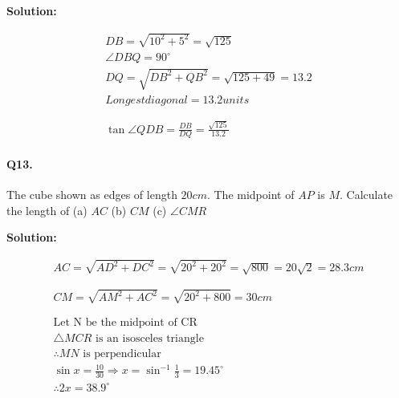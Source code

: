 \documentclass{article}
\begin{document}
{\scriptsize \textbf{Solution:}}

\[
  \begin{aligned}
    DB = \sqrt{10^{2}+5^{2}} = \sqrt{125} \\
    \angle DBQ = 90^{\circ} \\
    DQ = \sqrt{DB^{2}+QB^{2}} = \sqrt{125+49} = 13.2 \\
    Longest diagonal = 13.2 units \\
    \\
    \\
    \tan \angle QDB = \frac{DB}{DQ} = \frac{\sqrt{125}}{13.2}
  \end{aligned}
\]

\paragraph{Q13.}
The cube shown as edges of length $20cm$. The midpoint of $AP$ is $M$. Calculate the length of (a) $AC$ (b) $CM$ (c) $\angle CMR$


{\scriptsize \textbf{Solution:}}

\[
  \begin{aligned}
    AC = \sqrt{AD^{2} + DC^{2}} = \sqrt{20^{2} + 20^{2}} = \sqrt{800} = 20 \sqrt{2} = 28.3cm \\
    \\
    \\
    CM = \sqrt{AM^{2} + AC^{2}} = \sqrt{20^{2} + 800} = 30cm \\
    \\
    \\
    \text{Let N be the midpoint of CR} \\
    \triangle MCR \text{ is an isosceles triangle} \\
    \therefore MN \text{ is perpendicular} \\
    \sin x = \frac{10}{30} \Rightarrow x = \sin^{-1}\frac{1}{3}  = 19.45^{\circ} \\
    \therefore 2x = 38.9^{\circ}
  \end{aligned}
\]
\end{document}
